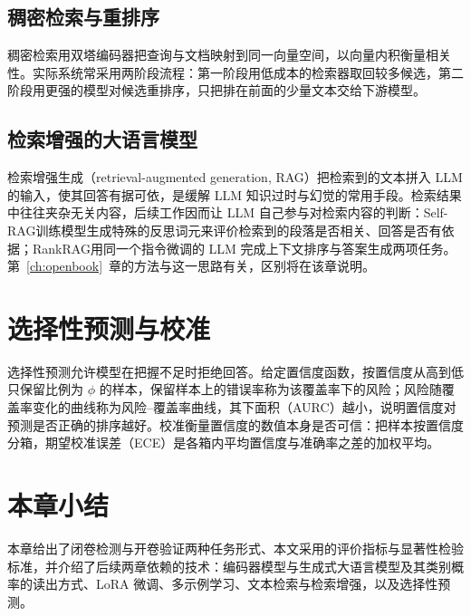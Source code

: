 \subsection{稠密检索与重排序}

稠密检索用双塔编码器把查询与文档映射到同一向量空间，以向量内积衡量相关性\citep{karpukhin2020dpr}。实际系统常采用两阶段流程：第一阶段用低成本的检索器取回较多候选，第二阶段用更强的模型对候选重排序，只把排在前面的少量文本交给下游模型。

\subsection{检索增强的大语言模型}

检索增强生成（retrieval-augmented generation, RAG）\citep{lewis2020rag}把检索到的文本拼入 LLM 的输入，使其回答有据可依，是缓解 LLM 知识过时与幻觉的常用手段。检索结果中往往夹杂无关内容，后续工作因而让 LLM 自己参与对检索内容的判断：Self-RAG\citep{asai2024selfrag}训练模型生成特殊的反思词元来评价检索到的段落是否相关、回答是否有依据；RankRAG\citep{yu2024rankrag}用同一个指令微调的 LLM 完成上下文排序与答案生成两项任务。第~\ref{ch:openbook}~章的方法与这一思路有关，区别将在该章说明。

\section{选择性预测与校准}\label{sec:bg-sel}

选择性预测允许模型在把握不足时拒绝回答。给定置信度函数，按置信度从高到低只保留比例为 $\phi$ 的样本，保留样本上的错误率称为该覆盖率下的风险；风险随覆盖率变化的曲线称为风险--覆盖率曲线，其下面积（AURC）越小，说明置信度对预测是否正确的排序越好\citep{geifman2017selective,geifman2019bias}。校准衡量置信度的数值本身是否可信：把样本按置信度分箱，期望校准误差（ECE）是各箱内平均置信度与准确率之差的加权平均\citep{guo2017calibration}。

\section{本章小结}

本章给出了闭卷检测与开卷验证两种任务形式、本文采用的评价指标与显著性检验标准，并介绍了后续两章依赖的技术：编码器模型与生成式大语言模型及其类别概率的读出方式、LoRA 微调、多示例学习、文本检索与检索增强，以及选择性预测。
